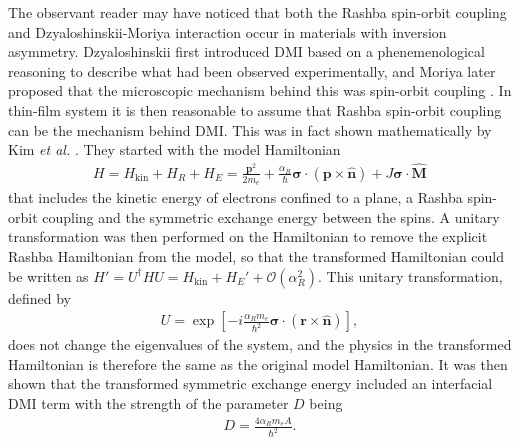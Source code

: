 \documentclass[12pt, a4paper, twoside, openright]{report}
\DeclareRobustCommand{\orderof}{\ensuremath{\mathcal{O}}}
\numberwithin{equation}{chapter}
\numberwithin{figure}{chapter}
\numberwithin{table}{chapter}
\begin{document}
The observant reader may have noticed that both the Rashba spin-orbit coupling and Dzyaloshinskii-Moriya interaction occur in materials with inversion asymmetry. Dzyaloshinskii first introduced DMI based on a phenemenological reasoning \citep{Dzyaloshinskii1958} to describe what had been observed experimentally, and Moriya later proposed that the microscopic mechanism behind this was spin-orbit coupling \cite{Moriya1960}. In thin-film system it is then reasonable to assume that Rashba spin-orbit coupling can be the mechanism behind DMI. This was in fact shown mathematically by Kim \textit{et al.} \citep{DMIfromRashba_Kim}. They started with the model Hamiltonian
\begin{align}
H = H_{\textrm{kin}} + H_R + H_E = \frac{\mathbold{p}^2}{2m_e} + \frac{\alpha_R}{\hbar}\mathbold{\sigma}\cdot(\mathbold{p}\times\mathbold{\hat{n}}) + J\mathbold{\sigma}\cdot\mathbold{\hat{M}}
\end{align}
that includes the kinetic energy of electrons confined to a plane, a Rashba spin-orbit coupling and the symmetric exchange energy between the spins. A unitary transformation was then performed on the Hamiltonian to remove the explicit Rashba Hamiltonian from the model, so that the transformed Hamiltonian could be written as $H' = U^{\dagger} H U = H_{\textrm{kin}} + H_E' + \orderof(\alpha_R^2)$. This unitary transformation, defined by
\begin{align}
U = \exp\left[-i\frac{\alpha_R m_e}{\hbar^2}\mathbold{\sigma}\cdot(\mathbold{r}\times\mathbold{\hat{n}})\right],
\end{align}
does not change the eigenvalues of the system, and the physics in the transformed Hamiltonian is therefore the same as the original model Hamiltonian. It was then shown that the transformed symmetric exchange energy included an interfacial DMI term with the strength of the parameter $D$ being
\begin{align}
D = \frac{4\alpha_Rm_e A}{\hbar^2}.
\end{align}
\end{document}
